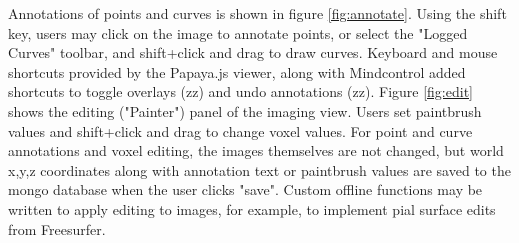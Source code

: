 Annotations of points and curves is shown in figure \ref{fig:annotate}. Using the shift key, users may click on the image to annotate points, or select the "Logged Curves" toolbar, and shift+click and drag to draw curves. Keyboard and mouse shortcuts provided by the Papaya.js viewer, along with Mindcontrol added shortcuts to toggle overlays (zz) and undo annotations (zz). Figure \ref{fig:edit} shows the editing ("Painter") panel of the imaging view. Users set paintbrush values and  shift+click and drag to change voxel values. For point and curve annotations and voxel editing, the images themselves are not changed, but world x,y,z coordinates along with annotation text or paintbrush values are saved to the mongo database when the user clicks "save". Custom offline functions may be written to apply editing to images, for example, to implement pial surface edits from Freesurfer. 